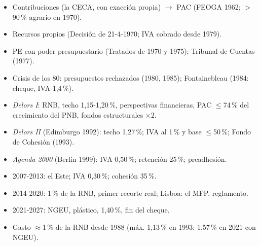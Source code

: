 \documentclass{article}
\begin{document}
\begin{columnas}
\begin{itemize}
\item Contribuciones (la CECA, con exacción propia) $\to$ PAC (FEOGA 1962; $>$90\,\% agrario en 1970).
\item Recursos propios (Decisión de 21-4-1970; IVA cobrado desde 1979).
\item PE con poder presupuestario (Tratados de 1970 y 1975); Tribunal de Cuentas (1977).
\item Crisis de los 80: presupuestos rechazados (1980, 1985); Fontainebleau (1984: cheque, IVA 1,4\,\%).
\end{itemize}
\begin{itemize}
\item \emph{Delors I}: RNB, techo 1,15-1,20\,\%, perspectivas financieras, PAC $\leq$74\,\% del crecimiento del PNB, fondos estructurales $\times2$.
\item \emph{Delors II} (Edimburgo 1992): techo 1,27\,\%; IVA al 1\,\% y base $\leq$50\,\%; Fondo de Cohesión (1993).
\item \emph{Agenda 2000} (Berlín 1999): IVA 0,50\,\%; retención 25\,\%; preadhesión.
\end{itemize}
\begin{itemize}
\item 2007-2013: el Este; IVA 0,30\,\%; cohesión 35\,\%.
\item 2014-2020: 1\,\% de la RNB, primer recorte real; Lisboa: el MFP, reglamento.
\item 2021-2027: NGEU, plástico, 1,40\,\%, fin del cheque.
\item Gasto $\approx$1\,\% de la RNB desde 1988 (máx. 1,13\,\% en 1993; 1,57\,\% en 2021 con NGEU).
\end{itemize}


\end{columnas}
\end{document}
